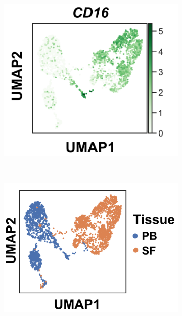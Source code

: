 \begin{figure}[H]
\begin{subfigure}[b]{0.40\textwidth}
\caption{}
\end{subfigure}
~
\begin{subfigure}[b]{0.40\textwidth} 
	\centering
	\includegraphics[width=\textwidth]{./Results3/pdfs/PSA_monocytes_scanpy_single_cell_CD16_UMAP}
	\caption{}
\end{subfigure}%
~
\begin{subfigure}[b]{0.45\textwidth} 
\centering
\includegraphics[width=\textwidth]{./Results3/pdfs/PSA_monocytes_scanpy_single_cell_SF_PB_UMAP}
\caption{}

\end{subfigure}
\end{figure}
